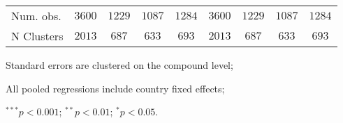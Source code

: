 \begin{threeparttable}
\begin{tabular}{l@{} c@{} c@{} c@{} c@{} c@{} c@{} c@{} c@{}}
Num. obs.                                      & $3600$         & $1229$         & $1087$        & $1284$        & $3600$         & $1229$         & $1087$         & $1284$         \\
N Clusters                                     & $2013$         & $687$          & $633$         & $693$         & $2013$         & $687$          & $633$          & $693$          \\
\bottomrule
\end{tabular}
\begin{tablenotes}[flushleft]
\scriptsize{\item[\hspace{-5mm}] Standard errors are clustered on the compound level; \item[\hspace{-5mm}] All pooled regressions include country fixed effects; \item[\hspace{-5mm}] $^{***}p<0.001$; $^{**}p<0.01$; $^{*}p<0.05$.}
\end{tablenotes}
\end{threeparttable}
